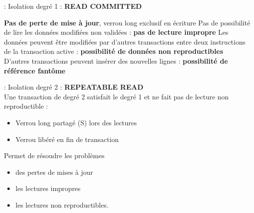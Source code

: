 \documentclass[10pt]{beamer}
\begin{document}
\begin{frame}{\secname : \subsecname}
    Isolation degré 1 : \textbf{READ COMMITTED} \\
    \begin{itemize}
        \pro \textbf{Pas de perte de mise à jour}, verrou long exclusif en écriture
        \pro Pas de  possibilité de lire les données modifiées non validées : \textbf{pas de lecture impropre}
        \con Les données peuvent être modifiées par d'autres transactions entre deux instructions de la transaction active : \textbf{possibilité de données non reproductibles}
        \con D'autres transactions peuvent insérer des nouvelles lignes : \textbf{possibilité de référence fantôme}
    \end{itemize}
\end{frame}

\begin{frame}{\secname : \subsecname}
    Isolation degré 2 : \textbf{REPEATABLE READ} \\
    Une transaction de degré 2 satisfait le degré 1 et ne fait pas de lecture non reproductible :
    \begin{itemize}
        \item Verrou long partagé (S) lors des lectures
        \item Verrou libéré en fin de transaction
    \end{itemize}
    Permet de résoudre les problèmes
    \begin{itemize}
        \item des pertes de mises à jour
        \item les lectures impropres
        \item les lectures non reproductibles.
    \end{itemize}
\end{frame}
\end{document}
